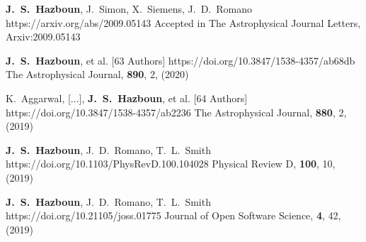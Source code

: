          {\textbf{J.~S.~Hazboun}, J.~{Simon}, X.~{Siemens}, J.~D.~{Romano}}
         {https://arxiv.org/abs/2009.05143}
         {Accepted in {The Astrophysical Journal Letters}, {Arxiv:}2009.05143}

         {\textbf{J.~S.~{Hazboun}}, et al. [63 Authors]}
         {https://doi.org/10.3847/1538-4357/ab68db}
         {{The Astrophysical Journal}, \textbf{890}, 2, (2020)}

         {K.~{Aggarwal}, [...], \textbf{J.~S.~{Hazboun}}, et al. [64 Authors]}
         {https://doi.org/10.3847/1538-4357/ab2236}
         {{The Astrophysical Journal}, \textbf{880}, 2, (2019)}

         {\textbf{J.~S.~Hazboun}, J.~D.~{Romano}, T.~L.~{Smith}}
         {https://doi.org/10.1103/PhysRevD.100.104028}
         {{Physical Review D}, \textbf{100}, 10, (2019)}

         {\textbf{J.~S.~Hazboun}, J.~D.~{Romano}, T.~L.~{Smith}}
         {https://doi.org/10.21105/joss.01775}
         {{Journal of Open Software Science}, \textbf{4}, 42, (2019)}


